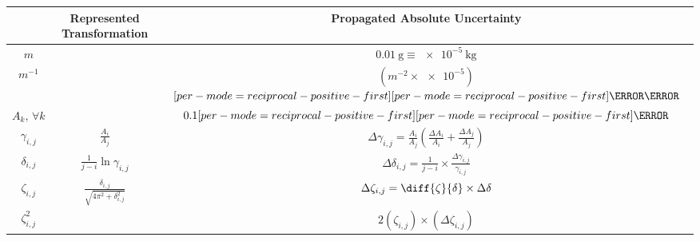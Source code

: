 \documentclass[a4paper,12pt]{article}
\let\oldsi\si
\renewcommand{\si}[1]{\oldsi[per-mode=reciprocal-positive-first]{#1}}
\newcommand{\thcolor}{\cellcolor{Blue!25}}
\newcommand{\chcolor}{\cellcolor{RedOrange!25}}
\begin{document}
\begin{table}[H]
  \begin{center}
    \bgroup
    \renewcommand{\arraystretch}{1.5}
    \begin{tabular}{|c|c|c|}
      \hline
      \thcolor {Variable}       & \thcolor Represented Transformation                   & \thcolor Propagated Absolute Uncertainty                                                          \\ \hline
      $m$                       &                                                       & $\SI{0.01}{\g} \equiv \SI{e-5}{\kg}$                                                              \\ \hline
      \chcolor $m^{-1}$         & \chcolor                                              & \chcolor $\left(m^{-2}\times\num{e-5}\right)$                                  $\si{\per\kg}$     \\ \hline
      $A_k,\,\forall k$         &                                                       & $0.1\si{\cm}$                                                                                     \\ \hline
      $\gamma_{i,j}$            & $\frac{A_i}{A_{j}}$                                   & $\Delta \gamma_{i, j} = \frac{A_i}{A_{j}}(\frac{\Delta A_i}{A_{i}} + \frac{\Delta A_{j}}{A_{j}})$ \\ \hline
      $\delta_{i,j}$            & $\frac{1}{j - i}\ln{\gamma_{i,j}}$                    & $\Delta \delta_{i,j} = \frac{1}{j - i}\times \frac{\Delta \gamma_{i,j}}{\gamma_{i,j}}$            \\ \hline
      $\zeta_{i, j}$            & $\frac{\delta_{i,j}}{\sqrt{4\pi^2 + \delta_{i,j}^2}}$ & $\Delta \zeta_{i, j} = \diff{\zeta}{\delta} \times \Delta\delta$                                  \\ \hline
      \chcolor $\zeta_{i, j}^2$ & \chcolor                                              & \chcolor $2(\zeta_{i, j})\times (\Delta \zeta_{i, j})$                                            \\ \hline
    \end{tabular}
    \label{tab:6}
    \egroup
  \end{center}
\end{table}

\vspace{\baselineskip}
\end{document}
